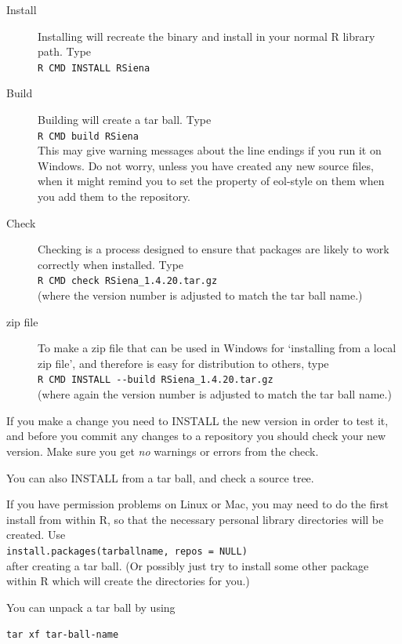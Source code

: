 \documentclass[a4paper,fleqn,11pt]{article}
\newcommand{\+}{\, + \,}
\begin{document}
\begin{description}
\item[Install] Installing will recreate the binary and install in your normal R
  library path. Type\\
\verb|R CMD INSTALL RSiena|
\item[Build] Building will create a tar ball. Type\\
\verb|R CMD build RSiena|\\
This may give warning messages about the line endings if you run it on
Windows. Do not worry, unless you have created any new source files, when it
might remind you to set the property of \textsf{eol-style} on them when you add
them to the repository.
\item [Check] Checking is a process designed to ensure that packages are likely
  to work correctly when installed. Type\\
\verb|R CMD check RSiena_1.4.20.tar.gz|\\
(where the version number is adjusted to match the tar ball name.)
\item[zip file] To make a zip file that can be used in Windows for
`installing from a local zip file', and therefore is easy for distribution
to others, type\\
\verb|R CMD INSTALL --build RSiena_1.4.20.tar.gz| \\
(where again the version number is adjusted to match the tar ball name.)
\end{description}

If you make a change you need to \textsf{INSTALL} the new version in order to
test it, and before you commit any changes to a repository you should
\textsf{check} your new version. Make sure you get \emph{no} warnings or
errors from the check.

You can also \textsf{INSTALL} from a tar ball, and \textsf{check} a source
tree.

If you have permission problems on Linux or Mac, you may need to do the first
install from within \textsf{R}, so that the necessary personal library
directories will be created. Use\\
\verb|install.packages(tarballname, repos = NULL)| \\after creating a tar
ball. (Or possibly just try to install some other package within R which will
create the directories for you.)

You can unpack a tar ball by using

\verb|tar xf tar-ball-name|
\end{document}
